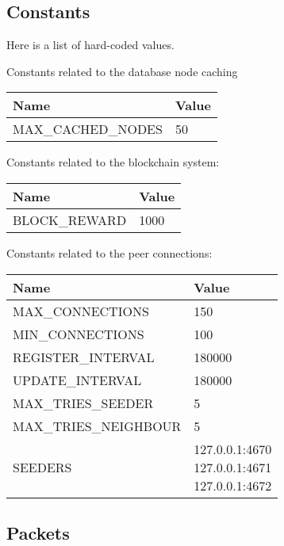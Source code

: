 \documentclass[../documentation.tex]{subfiles}
\begin{document}
\subsection{Constants}

Here is a list of hard-coded values.

Constants related to the database node caching

\bgroup{}
\def\arraystretch{1.25}
\begin{tabular}{|l|l|}
    \hline
    \textbf{Name} & \textbf{Value}
    \\ \hline
    MAX\_CACHED\_NODES & 50
    \\ \hline
\end{tabular}
\egroup{}

Constants related to the blockchain system:

\bgroup{}
\def\arraystretch{1.25}
\begin{tabular}{|l|l|}
    \hline
    \textbf{Name} & \textbf{Value}
    \\ \hline
    BLOCK\_REWARD & 1000
    \\ \hline
\end{tabular}
\egroup{}

Constants related to the peer connections:

\bgroup{}
\def\arraystretch{1.25}
\begin{tabular}{|l|l|}
    \hline
    \textbf{Name} & \textbf{Value}
    \\ \hline
    MAX\_CONNECTIONS & 150
    \\ \hline
    MIN\_CONNECTIONS & 100
    \\ \hline
    REGISTER\_INTERVAL & 180000
    \\ \hline
    UPDATE\_INTERVAL & 180000
    \\ \hline
    MAX\_TRIES\_SEEDER & 5
    \\ \hline
    MAX\_TRIES\_NEIGHBOUR & 5
    \\ \hline
    SEEDERS & \makecell[t] {
        127.0.0.1:4670 \\
        127.0.0.1:4671 \\
        127.0.0.1:4672
    }
    \\ \hline
\end{tabular}
\egroup{}

\subsection{Packets}

\end{document}
